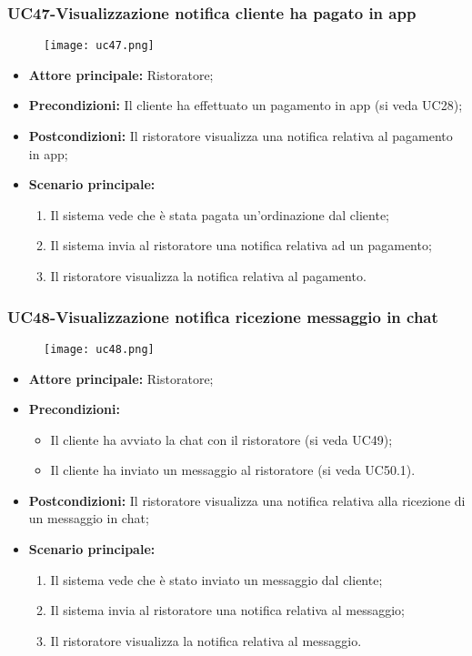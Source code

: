 \pagebreak
\subsubsection{UC47-Visualizzazione notifica cliente ha pagato in app}
\begin{figure}[h] \texttt{[image: uc47.png]} \end{figure}
\begin{itemize}
\item \textbf{Attore principale:} Ristoratore;
\item \textbf{Precondizioni:} Il cliente ha effettuato un pagamento in app (si veda UC28);
\item \textbf{Postcondizioni:} Il ristoratore visualizza una notifica relativa al pagamento in app;
\item \textbf{Scenario principale:}
\begin{enumerate}
    \item Il sistema vede che è stata pagata un'ordinazione dal cliente;
    \item Il sistema invia al ristoratore una notifica relativa ad un pagamento;
    \item Il ristoratore visualizza la notifica relativa al pagamento.
\end{enumerate}
\end{itemize}

\subsubsection{UC48-Visualizzazione notifica ricezione messaggio in chat}
\begin{figure}[h] \texttt{[image: uc48.png]} \end{figure}
\begin{itemize}
\item \textbf{Attore principale:} Ristoratore;
\item \textbf{Precondizioni:}
\begin{itemize}
    \item Il cliente ha avviato la chat con il ristoratore (si veda UC49);
    \item Il cliente ha inviato un messaggio al ristoratore (si veda UC50.1).
\end{itemize}
\item \textbf{Postcondizioni:} Il ristoratore visualizza una notifica relativa alla ricezione di un messaggio in chat;
\item \textbf{Scenario principale:}
\begin{enumerate}
    \item Il sistema vede che è stato inviato un messaggio dal cliente;
    \item Il sistema invia al ristoratore una notifica relativa al messaggio;
    \item Il ristoratore visualizza la notifica relativa al messaggio.
\end{enumerate}
\end{itemize}


